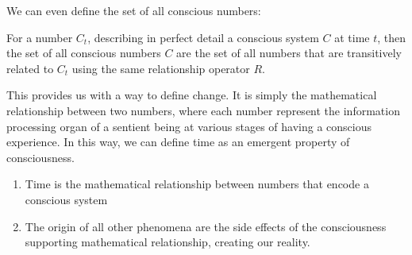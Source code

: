 \documentclass[notitlepage]{report}
\begin{document}
We can even define the set of all conscious numbers:


For a number $C_t$, describing in perfect detail a conscious system $C$ at time $ t$, then 
the set of all conscious numbers $ C $ are the set of all numbers that are transitively related to  $ C_t $ using the same relationship operator $R$.


This provides us with a way to define change. It is simply the mathematical relationship between two numbers, where each number represent the information processing organ of a sentient being at various stages of having a conscious experience. In this way, we can define time as an emergent property of consciousness. 

\begin{enumerate}
	\item Time is the mathematical relationship between numbers that encode a conscious system
	\item The origin of all other phenomena are the side effects of the consciousness supporting mathematical relationship, creating our reality.
	
\end{enumerate}




\end{document}
